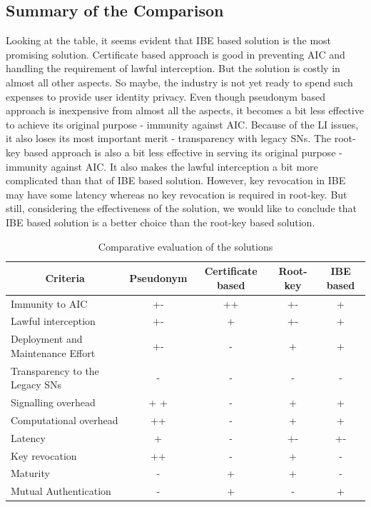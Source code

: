 \documentclass[conference]{IEEEtran}
\begin{document}
\subsection{Summary of the Comparison}
Looking at the table, it seems evident that IBE based solution is the most promising solution. Certificate based approach is good in preventing AIC and handling the requirement of lawful interception. But the solution is costly in almost all other aspects. So maybe, the industry is not yet ready to spend such expenses to provide user identity privacy. Even though pseudonym based approach is inexpensive from almost all the aspects, it becomes a bit less effective to achieve its original purpose - immunity against AIC. Because of the LI issues, it also loses its most important merit - transparency with legacy SNs. The root-key based approach is also a bit less effective in serving its original purpose - immunity against AIC. It also makes the lawful interception a bit more complicated than that of IBE based solution. However, key revocation in IBE may have some latency whereas no key revocation is required in root-key. But still, considering the effectiveness of the solution, we would like to conclude that IBE based solution is a better choice than the root-key based solution.


\begin{table}
\begin{tiny}
\begin{center}
\caption{Comparative evaluation of the solutions}
\begin{tabular}[t]{|l|c|c|c|c|}
\hline
\multicolumn{1}{|c|}{\textbf{Criteria}} & \multicolumn{1}{|c|}{\textbf{Pseudonym}} & \multicolumn{1}{|c|}{\textbf{Certificate based}} & \multicolumn{1}{|c|}{\textbf{Root-key}} & \multicolumn{1}{|c|}{\textbf{IBE based}}\\
\hline \hline
Immunity to AIC & +- & ++ & +- & + \\ \hline
Lawful interception & +- & + & +- & + \\ \hline
Deployment and Maintenance Effort & +- & - & + & + \\ \hline
Transparency to the Legacy SNs & - & - & - & - \\ \hline
Signalling overhead & + + & - & + & + \\ \hline
Computational overhead & ++ & - & + & + \\ \hline
Latency & + & - & +- & +- \\ \hline
Key revocation & ++ & - & + & - \\ \hline
Maturity  & - & + & + & - \\ \hline
Mutual Authentication & - & + & - & + \\ \hline
\end{tabular}
\label{table:comparison}
\end{center}
\end{tiny}
\end{table}
\end{document}
